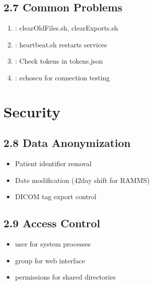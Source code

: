\documentclass[letterpaper,10pt,english]{sphinxmanual}
\begin{document}
\subsection{2.7 Common Problems}
\label{\detokenize{Temp/admin-options:common-problems}}\begin{enumerate}
%
\item {} 
\sphinxAtStartPar
{}: clearOldFiles.sh, clearExports.sh

\item {} 
\sphinxAtStartPar
{}: heartbeat.sh restarts services

\item {} 
\sphinxAtStartPar
{}: Check tokens in tokens.json

\item {} 
\sphinxAtStartPar
{}: echoscu for connection testing

\end{enumerate}


\section{Security}
\label{\detokenize{Temp/admin-options:security}}

\subsection{2.8 Data Anonymization}
\label{\detokenize{Temp/admin-options:data-anonymization}}\begin{itemize}
\item {} 
\sphinxAtStartPar
Patient identifier removal

\item {} 
\sphinxAtStartPar
Date modification (42\sphinxhyphen{}day shift for RAM\sphinxhyphen{}MS)

\item {} 
\sphinxAtStartPar
DICOM tag export control

\end{itemize}


\subsection{2.9 Access Control}
\label{\detokenize{Temp/admin-options:access-control}}\begin{itemize}
\item {} 
\sphinxAtStartPar
{} user for system processes

\item {} 
\sphinxAtStartPar
{} group for web interface

\item {} 
 permissions for shared directories

\end{itemize}
\end{document}

